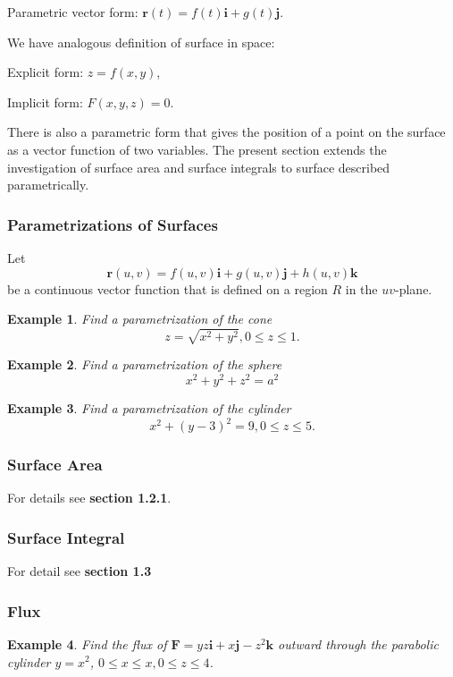\documentclass[a4paper,12pt]{article}
\newtheorem{example}{Example}             %
\begin{document}
\begin{CJK}{UTF8}{gbsn}
Parametric vector form: $\bm{r}(t) = f(t)\bm{i} + g(t)\bm{j}$.

We have analogous definition of surface in space:

Explicit form: $z = f(x,y)$,

Implicit form: $F(x,y,z) = 0$.

There is also a parametric form that gives the position 
of a point on the surface as a vector function of two 
variables. The present section extends the investigation 
of surface area and surface integrals to surface described 
parametrically.

\subsubsection{Parametrizations of Surfaces}

Let 
\begin{equation}
    \bm{r}(u,v) = f(u,v)\bm{i} + g(u,v)\bm{j} + h(u,v)\bm{k}
    \label{eq:eq12}
\end{equation}
be a continuous vector function that is defined on a region $R$
in the $uv$-plane.

\begin{example}
    Find a parametrization of the cone
    \[
        z = \sqrt{x^2+y^2}, 0 \le z \le 1.
    \]
\end{example}

\begin{example}
    Find a parametrization of the sphere 
    \[
        x^2 + y^2 +z^2 = a^2
    \]
\end{example}

\begin{example}
    Find a parametrization of the cylinder 
    \[
        x^2 + \left(y-3\right)^2 = 9, 0 \le z \le 5.
    \]
\end{example}

\subsubsection{Surface Area}
For details see \textbf{section 1.2.1}.
\subsubsection{Surface Integral}
For detail see \textbf{section 1.3}
\subsubsection{Flux}
\begin{example}
    Find the flux of $\bm{F} = yz\bm{i} + x\bm{j} -z^2\bm{k}$
    outward through the parabolic cylinder $y = x^2$, 
    $0 \le x \le x, 0 \le z \le 4$.
\end{example}


\end{CJK}
\end{document}

